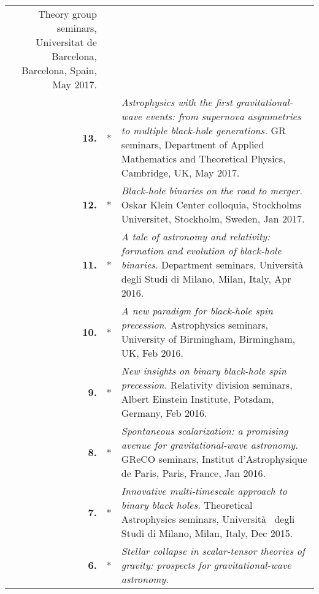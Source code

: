 {\begin{longtable}{rp{0.3cm}p{15.8cm}}
\newline{}
Theory group seminars, Universitat de Barcelona, Barcelona, Spain, May 2017.
\vspace{0.05cm}\\
%
\textbf{13.} & * & \textit{Astrophysics with the first gravitational-wave events: from supernova asymmetries to multiple black-hole generations.}
\newline{}
GR seminars, Department of Applied Mathematics and Theoretical Physics, Cambridge, UK, May 2017.
\vspace{0.05cm}\\
%
\textbf{12.} & * & \textit{Black-hole binaries on the road to merger.}
\newline{}
Oskar Klein Center colloquia, Stockholms Universitet, Stockholm, Sweden, Jan 2017.
\vspace{0.05cm}\\
%
\textbf{11.} & * & \textit{A tale of astronomy and relativity: formation and evolution of black-hole binaries.}
\newline{}
Department seminars, Universit\`{a}  degli Studi di Milano, Milan, Italy, Apr 2016.
\vspace{0.05cm}\\
%
\textbf{10.} & * & \textit{A new paradigm for black-hole spin precession.}
\newline{}
Astrophysics seminars, University of Birmingham, Birmingham, UK, Feb 2016.
\vspace{0.05cm}\\
%
\textbf{9.} & * & \textit{New insights on binary black-hole spin precession.}
\newline{}
Relativity division seminars, Albert Einstein Institute, Potsdam, Germany, Feb 2016.
\vspace{0.05cm}\\
%
\textbf{8.} & * & \textit{Spontaneous scalarization: a promising avenue for gravitational-wave astronomy.}
\newline{}
GReCO seminars, Institut d'Astrophysique de Paris, Paris, France, Jan 2016.
\vspace{0.05cm}\\
%
\textbf{7.} & * & \textit{Innovative multi-timescale approach to binary black holes.}
\newline{}
Theoretical Astrophysics seminars, Universit\`{a}  degli Studi di Milano, Milan, Italy, Dec 2015.
\vspace{0.05cm}\\
%
\textbf{6.} & * & \textit{Stellar collapse in scalar-tensor theories of gravity: prospects for gravitational-wave astronomy.}

\end{longtable}}
